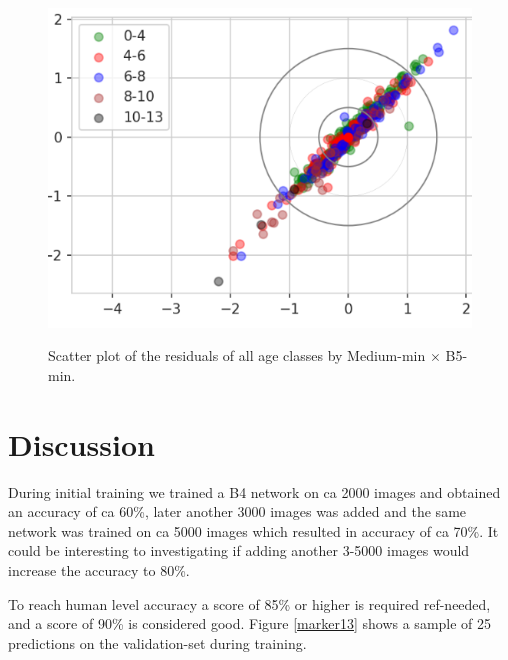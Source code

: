 \documentclass[10pt,letterpaper]{article}
\begin{document}
\begin{figure}[h!]
  \caption{Scatter plot of the residuals of all age classes by Medium-min $\times$ B5-min.}
  \centering
  \includegraphics[scale=0.8]{results/eda/m_min_x_b5_min_residualb.png}
  \label{marker12b}
\end{figure}

\section*{Discussion}

During initial training we trained a B4 network on ca 2000 images and obtained an accuracy of ca 60\%, later another 3000 images was added and the same
network was trained on ca 5000 images which resulted in accuracy of ca 70\%.
It could be interesting to investigating if adding another 3-5000 images
would increase the accuracy to 80\%.

To reach human level accuracy a score of 85\% or higher is required ref-needed,
and a score of 90\% is considered good. Figure \ref{marker13} shows a sample of 25 predictions on the validation-set during training.
\end{document}

